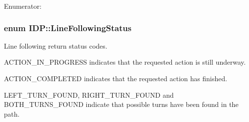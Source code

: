 \begin{Desc}
\item[Enumerator: ]\par
\begin{description}
\item[{\em 
\hypertarget{namespaceIDP_a6efd2cca14c0dae1c6458714ce0218dfa1bbb59488c1d089eefb9b54146bcdb26}{
BOBBIN\_\-RED}
\label{namespaceIDP_a6efd2cca14c0dae1c6458714ce0218dfa1bbb59488c1d089eefb9b54146bcdb26}
}]\item[{\em 
\hypertarget{namespaceIDP_a6efd2cca14c0dae1c6458714ce0218dfa047d7c5fcd5669f1a819d05fb5319f0b}{
BOBBIN\_\-GREEN}
\label{namespaceIDP_a6efd2cca14c0dae1c6458714ce0218dfa047d7c5fcd5669f1a819d05fb5319f0b}
}]\item[{\em 
\hypertarget{namespaceIDP_a6efd2cca14c0dae1c6458714ce0218dfa8f427bfb1c335650a7ada595e1607d00}{
BOBBIN\_\-WHITE}
\label{namespaceIDP_a6efd2cca14c0dae1c6458714ce0218dfa8f427bfb1c335650a7ada595e1607d00}
}]\end{description}
\end{Desc}

\hypertarget{namespaceIDP_a5993bdfdd901fc5521c8df42dca43bd0}{
\subsubsection[{LineFollowingStatus}]{\setlength{\rightskip}{0pt plus 5cm}enum {\bf IDP::LineFollowingStatus}}}
\label{namespaceIDP_a5993bdfdd901fc5521c8df42dca43bd0}


Line following return status codes. 

ACTION\_\-IN\_\-PROGRESS indicates that the requested action is still underway.

ACTION\_\-COMPLETED indicates that the requested action has finished.

LEFT\_\-TURN\_\-FOUND, RIGHT\_\-TURN\_\-FOUND and BOTH\_\-TURNS\_\-FOUND indicate that possible turns have been found in the path.

